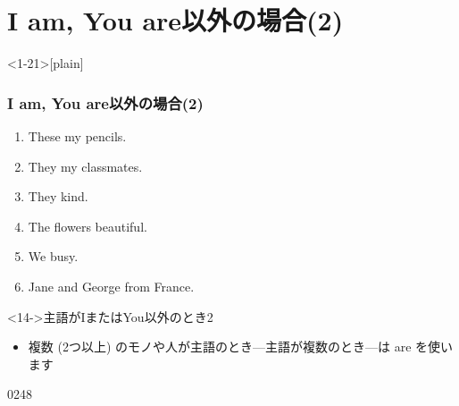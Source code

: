 \documentclass[aspectratio=169,xcolor={dvipsnames,table}]{beamer}
\begin{document}
\section{I am, You are以外の場合(2)}

\begin{frame}<1-21>[plain]\frametitle{I am, You are以外の場合(2)}
  \begin{enumerate}
   \item<1-> These \textbf{\color{Maroon}{are}} my pencils. \hfill{}
   \item<1-> They \textbf{\color{Maroon}{are}} my classmates. \hfill{}
   \item<1-> They \textbf{\color{Maroon}{are}} kind. \hfill{}
   \item<1-> The flowers \textbf{\color{Maroon}{are}} beautiful. \hfill{}
   \item<1-> We \textbf{\color{Maroon}{are}} busy. \hfill{}
   \item<1-> Jane and George \textbf{\color{Maroon}{are}} from France. \hfill{}
  \end{enumerate}

\bigskip

\begin{block}<14->{主語がIまたはYou以外のとき2}\small
\begin{itemize}[square]
 \item   複数 (2つ以上) のモノや人が主語のとき---主語が複数のとき---は
are を使います
\end{itemize}
     \end{block}


\hfill{\tiny 0248}\,{\scriptsize {}}

\end{frame}
\end{document}

